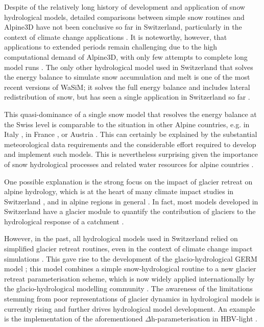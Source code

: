 \documentclass[10pt,a4paper]{article}
\begin{document}
Despite of the relatively long history of development and application of snow hydrological models, detailed comparisons between simple snow routines and Alpine3D have not been conclusive so far in Switzerland, particularly in the context of climate change applications \citep{Kobierska2011, Shakoor2018}. It is noteworthy, however, that applications to extended periods remain challenging due to the high computational demand of Alpine3D, with only few attempts to complete long model runs \citep{Michel2021}. The only other hydrological model used in Switzerland that solves the energy balance to simulate snow accumulation and melt is one of the most recent versions of WaSiM; it solves the full energy balance and includes lateral redistribution of snow, but has seen a single application in Switzerland so far \citep{Thornton2021}. 

This quasi-dominance of a single snow model that resolves the energy balance at the Swiss level is comparable to the situation in other Alpine countries, e.g. in Italy \citep[Geotop;][]{Endrizzi2014}, in France \citep[Crocus;][]{Vionnet2012}, or Austria \citep[Admunsen;][]{Strasser2004}. This can certainly be explained by the substantial meteorological data requirements and the considerable effort required to develop and implement such models. This is nevertheless surprising given the importance of snow hydrological processes and related water resources for alpine countries \citep{Beniston2018}.

One possible explanation is the strong focus on the impact of glacier retreat on alpine hydrology, which is at the heart of many climate impact studies in Switzerland \citep{Horton2006, Schaefli2007b, Junghans2011, Addor2014, Finger2015, Etter2017}, and in alpine regions in general \citep{Huss2017}. In fact, most models developed in Switzerland have a glacier module to quantify the contribution of glaciers to the hydrological response of a catchment \citep[see for example][]{Finger2011, Verbunt2003, Zappa2007a, Uhlmann2013a}. 
 
However, in the past, all hydrological models used in Switzerland relied on simplified glacier retreat routines, even in the context of climate change impact simulations \citep[e.g.][]{Horton2006}. This gave rise to the development of the glacio-hydrological GERM model \citep{Huss2016, Junghans2011, Farinotti2012, Finger2013}; this model combines a simple snow-hydrological routine to a new glacier retreat parameterisation scheme, which is now widely applied internationally by the glacio-hydrological modelling community \citep[][called $\Delta$h-parametrisation]{Huss2010}. The awareness of the limitations stemming from poor representations of glacier dynamics in hydrological models is currently rising and further drives hydrological model development. An example is the implementation of the aforementioned $\Delta$h-parameterisation in HBV-light \citep{Seibert2018b}. 
\end{document}
